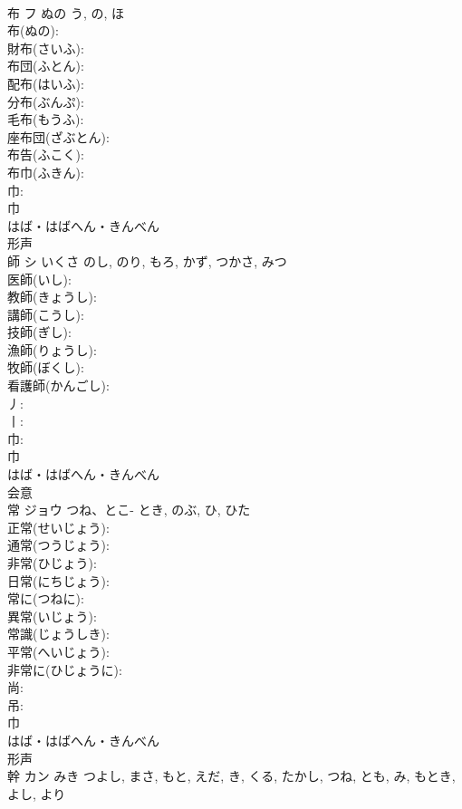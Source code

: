 \documentclass[8pt]{extreport}
\begin{document}
\begin{CJK}{UTF8}{min}
\\	布	フ	ぬの	う, の, ほ	
\\	布(ぬの): 
\\	財布(さいふ): 
\\	布団(ふとん): 
\\	配布(はいふ): 
\\	分布(ぶんぷ): 
\\	毛布(もうふ): 
\\	座布団(ざぶとん): 
\\	布告(ふこく): 
\\	布巾(ふきん): 
\\	巾: 
\\	巾	
\\	はば・はばへん・きんべん	
\\	形声 
\\	師	シ	いくさ	のし, のり, もろ, かず, つかさ, みつ	
\\	医師(いし): 
\\	教師(きょうし): 
\\	講師(こうし): 
\\	技師(ぎし): 
\\	漁師(りょうし): 
\\	牧師(ぼくし): 
\\	看護師(かんごし): 
\\	丿: 
\\	丨: 
\\	巾: 
\\	巾	
\\	はば・はばへん・きんべん	
\\	会意 
\\	常	ジョウ	つね、とこ-	とき, のぶ, ひ, ひた	
\\	正常(せいじょう): 
\\	通常(つうじょう): 
\\	非常(ひじょう): 
\\	日常(にちじょう): 
\\	常に(つねに): 
\\	異常(いじょう): 
\\	常識(じょうしき): 
\\	平常(へいじょう): 
\\	非常に(ひじょうに): 
\\	尚: 
\\	吊: 
\\	巾	
\\	はば・はばへん・きんべん	
\\	形声 
\\	幹	カン	みき	つよし, まさ, もと, えだ, き, くる, たかし, つね, とも, み, もとき, よし, より	

\end{CJK}
\end{document}
